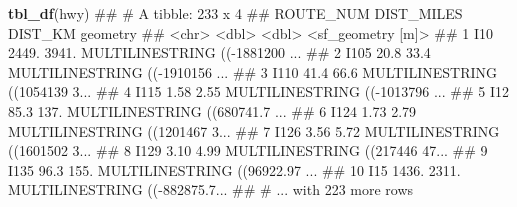\documentclass[11pt,ignorenonframetext,]{beamer}
\newenvironment{Shaded}{}{}
\newcommand{\KeywordTok}[1]{\textcolor[rgb]{0.00,0.44,0.13}{\textbf{#1}}}
\newcommand{\NormalTok}[1]{#1}
\let\oldShaded\Shaded
\let\endoldShaded\endShaded
\renewenvironment{Shaded}{\footnotesize\begin{spacing}{0.9}\oldShaded}{\endoldShaded\end{spacing}}
\let\oldverbatim\verbatim
\let\endoldverbatim\endverbatim
\newcommand{\scriptoutput}{
  \renewenvironment{Shaded}{\scriptsize\begin{spacing}{0.9}\oldShaded}{\endoldShaded\end{spacing}}
  \renewenvironment{verbatim}{\scriptsize\begin{spacing}{0.9}\oldverbatim}{\endoldverbatim\end{spacing}}
}
\begin{document}
\begin{frame}[fragile,t]{}
\protect\hypertarget{section-3}{}

\scriptoutput

\begin{Shaded}
\begin{Highlighting}[]
\KeywordTok{tbl_df}\NormalTok{(hwy)}
\NormalTok{## # A tibble: 233 x 4}
\NormalTok{##    ROUTE_NUM DIST_MILES DIST_KM                       geometry}
\NormalTok{##    <chr>          <dbl>   <dbl>              <sf_geometry [m]>}
\NormalTok{##  1 I10          2449.   3941.   MULTILINESTRING ((-1881200 ...}
\NormalTok{##  2 I105           20.8    33.4  MULTILINESTRING ((-1910156 ...}
\NormalTok{##  3 I110           41.4    66.6  MULTILINESTRING ((1054139 3...}
\NormalTok{##  4 I115            1.58    2.55 MULTILINESTRING ((-1013796 ...}
\NormalTok{##  5 I12            85.3   137.   MULTILINESTRING ((680741.7 ...}
\NormalTok{##  6 I124            1.73    2.79 MULTILINESTRING ((1201467 3...}
\NormalTok{##  7 I126            3.56    5.72 MULTILINESTRING ((1601502 3...}
\NormalTok{##  8 I129            3.10    4.99 MULTILINESTRING ((217446 47...}
\NormalTok{##  9 I135           96.3   155.   MULTILINESTRING ((96922.97 ...}
\NormalTok{## 10 I15          1436.   2311.   MULTILINESTRING ((-882875.7...}
\NormalTok{## # ... with 223 more rows}
\end{Highlighting}
\end{Shaded}

\end{frame}
\end{document}
